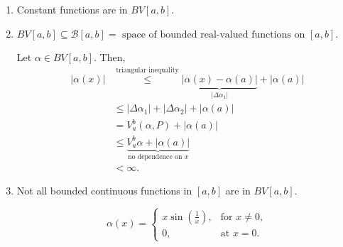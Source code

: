 \documentclass[letterpaper, reqno,11pt]{article}
\begin{document}
\medskip

\begin{enumerate}
\item Constant functions are in $BV[a, b]$.
\item $BV[a, b] \subseteq \mathcal B[a, b] = \text{ space of bounded real-valued functions on $[a, b]$}$.

  Let $\alpha \in BV[a, b]$. Then,
  \begin{align*}
    |\alpha(x)| & \overset{\text{triangular inequality}}{\leq} \underbrace{|\alpha(x) - \alpha(a)|}_{|\Delta \alpha_1|} + |\alpha(a)| \\
    &\leq |\Delta \alpha_1| + |\Delta \alpha_2| + |\alpha(a)| \\
    &= V_a^b (\alpha, P) + |\alpha(a)| \\
    &\leq \underbrace{V_a^b \alpha + |\alpha(a)|}_\text{no dependence on $x$} \\
    &< \infty.
  \end{align*}

  \begin{figure}[H]
    \centering
  \end{figure}
\item Not all bounded continuous functions in $[a, b]$ are in $BV[a, b]$.

  $$ \alpha(x) = \left\{
  \begin{array}{ll}
    x \sin\left(\frac{1}{x}\right), & \text{for $x \neq 0$}, \\
    0, & \text{at $x = 0$}.
  \end{array}
  \right. $$


\end{enumerate}
\end{document}
